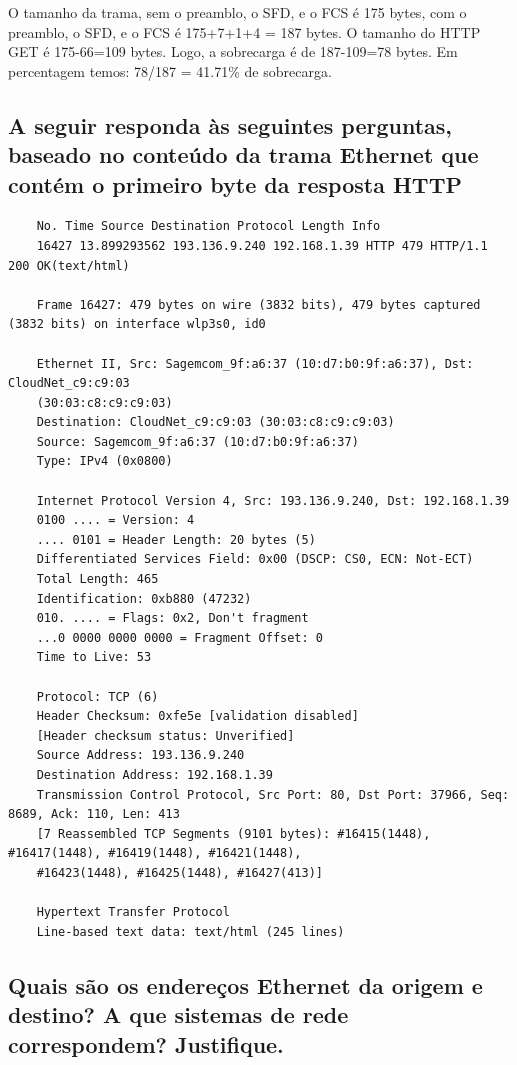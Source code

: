 \documentclass{article}
\begin{document}
O tamanho da trama, sem o preamblo, o SFD, e o FCS é 175 bytes, com o preamblo, o SFD, e o FCS é 175+7+1+4 = 187 bytes.
O tamanho do HTTP GET é 175-66=109 bytes. Logo, a sobrecarga é de 187-109=78 bytes.
Em percentagem temos: 78/187 = 41.71\% de sobrecarga.

\subsection*{A seguir responda às seguintes perguntas, baseado no conteúdo da trama Ethernet que
contém o primeiro byte da resposta HTTP}

\begin{verbatim}
    No. Time Source Destination Protocol Length Info
    16427 13.899293562 193.136.9.240 192.168.1.39 HTTP 479 HTTP/1.1 200 OK(text/html)

    Frame 16427: 479 bytes on wire (3832 bits), 479 bytes captured (3832 bits) on interface wlp3s0, id0

    Ethernet II, Src: Sagemcom_9f:a6:37 (10:d7:b0:9f:a6:37), Dst: CloudNet_c9:c9:03
    (30:03:c8:c9:c9:03)
    Destination: CloudNet_c9:c9:03 (30:03:c8:c9:c9:03)
    Source: Sagemcom_9f:a6:37 (10:d7:b0:9f:a6:37)
    Type: IPv4 (0x0800)

    Internet Protocol Version 4, Src: 193.136.9.240, Dst: 192.168.1.39
    0100 .... = Version: 4
    .... 0101 = Header Length: 20 bytes (5)
    Differentiated Services Field: 0x00 (DSCP: CS0, ECN: Not-ECT)
    Total Length: 465
    Identification: 0xb880 (47232)
    010. .... = Flags: 0x2, Don't fragment
    ...0 0000 0000 0000 = Fragment Offset: 0
    Time to Live: 53

    Protocol: TCP (6)
    Header Checksum: 0xfe5e [validation disabled]
    [Header checksum status: Unverified]
    Source Address: 193.136.9.240
    Destination Address: 192.168.1.39
    Transmission Control Protocol, Src Port: 80, Dst Port: 37966, Seq: 8689, Ack: 110, Len: 413
    [7 Reassembled TCP Segments (9101 bytes): #16415(1448), #16417(1448), #16419(1448), #16421(1448),
    #16423(1448), #16425(1448), #16427(413)]

    Hypertext Transfer Protocol
    Line-based text data: text/html (245 lines)
\end{verbatim}

\subsection{Quais são os endereços Ethernet da origem e destino? A que sistemas de rede
correspondem? Justifique.}
\end{document}
